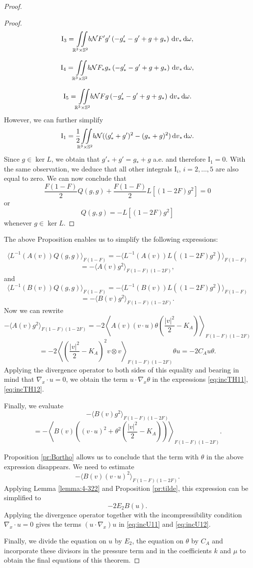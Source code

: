 \begin{proof}
\begin{proof}
    \[\mathrm I_3 = {\iint\limits_{\mathbb R^3\times\mathbb S^2}} b {\mathcal {N}} F' g'  \left(-g'_\ast-g'  +g +g_\ast\right){\,\mathrm{d} v}_\ast{\,\mathrm{d} \omega},   \]

      \[\mathrm I_4 = {\iint\limits_{\mathbb R^3\times\mathbb S^2}} b {\mathcal {N}} F_\ast g_\ast   \left(-g'_\ast-g'  +g +g_\ast\right){\,\mathrm{d} v}_\ast{\,\mathrm{d} \omega} ,  \]

        \[\mathrm I_5 = {\iint\limits_{\mathbb R^3\times\mathbb S^2}} b {\mathcal {N}} F g   \left(-g'_\ast-g'  +g +g_\ast\right){\,\mathrm{d} v}_\ast{\,\mathrm{d} \omega} .  \]
However, we can further simplify 
 \[\mathrm I_1 = \frac 12 {\iint\limits_{\mathbb R^3\times\mathbb S^2}} b {\mathcal {N}} (  (g'_\ast+g')^2 -(g _\ast+ g)^2){\,\mathrm{d} v}_\ast{\,\mathrm{d} \omega}.   \]
Since $g\in \ker L$, we obtain that $ g'_\ast+g'  = g _\ast+ g $ a.e. and therefore $\mathrm I_1=0$.
With the same observation, we deduce that all other integrals $\mathrm I_i$, $i=2,\ldots,5$ are also equal to zero.
 We can now conclude that 
 \[\frac {F(1-F)}{2}Q(g,g)+\frac {F(1-F)}{2}L[(1-2F)g^2]=0\]
 or \[ Q(g,g)=- L[(1-2F)g^2]\]
 whenever $g\in\ker L$.
\end{proof}
 
 The above Proposition enables us to simplify the following expressions:

\[\langle  L^{-1}(A(v)) Q (g ,g )\rangle_{F(1-F)}=-\langle  L^{-1}(A(v)) L
((1-2F)g^2 )\rangle_{F(1-F)}\]
\[=-\langle    A(v)    g^2 \rangle_{F(1-F)(1-2F)},\]
and
\[\langle  L^{-1}(B(v)) Q (g ,g )\rangle_{F(1-F)}=-\langle  L^{-1}(B(v)) L
((1-2F)g^2 )\rangle_{F(1-F)}\]
\[=-\langle    B(v)    g^2 \rangle_{F(1-F)(1-2F)}.\]
Now we can rewrite
\[-\langle    A(v)    g^2 \rangle_{F(1-F)(1-2F)}=-2 \left\langle    A(v)   
(v\cdot u)\theta\left(\frac{|v|^2}{2}-K_A\right) \right\rangle_{F(1-F)(1-2F)}\]
\[=-2 \left\langle   \left(\frac{|v|^2}{2}-K_A\right)^2 v\otimes v
\right\rangle_{F(1-F)(1-2F)}\theta u=-2C_Au\theta.\]
Applying the divergence operator to both sides of this equality and bearing in mind that $\nabla_x\cdot u=0$, we obtain the term $u\cdot\nabla_x\theta$ in
the expressions \eqref{eq:incTH11}, \eqref{eq:incTH12}.

Finally, we evaluate
\[  -\langle    B(v)    g^2 \rangle_{F(1-F)(1-2F)}\]\[ =-\left\langle    B(v)   
\left((v\cdot u)^2+\theta^2\left(\frac{|v|^2}{2}-K_A\right)\right)
\right\rangle_{F(1-F)(1-2F)}.\]
 
Proposition \ref{pr:Bortho} allows us to conclude that the term with
$\theta$ in the above expression %
 disappears. We need to  estimate
\[-\langle    B(v)     (v\cdot u)^2  \rangle_{F(1-F)(1-2F)}.\]
Applying Lemma  \ref{lemma:4-322} and Proposition \ref{pr:tilde}, this expression can be simplified to
\[-2 E_{2}B(u).\]
Applying the divergence operator together with the incompressibility condition $\nabla_x \cdot u=0$ gives the terms $(u\cdot\nabla_x)u$ in
 \eqref{eq:incU11} and \eqref{eq:incU12}.

 Finally, we divide the equation on $u$ by $E_2$, the equation on $\theta$ by $C_A$ and incorporate these divisors in the pressure term and in the coefficients $k$ and $\mu$ to obtain the final equations of this theorem.
\end{proof}


